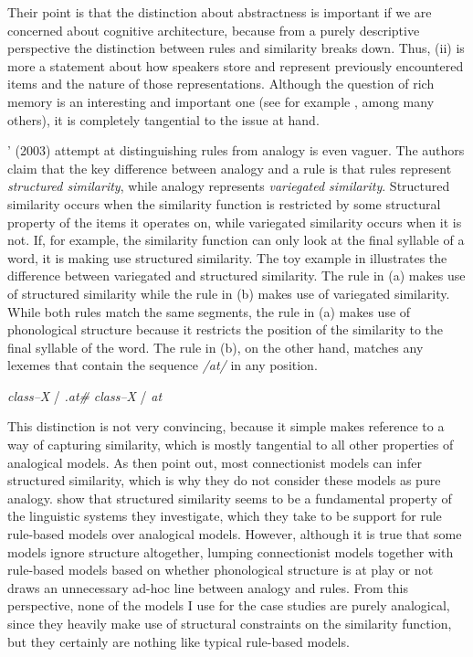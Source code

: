 Their point is that the distinction about abstractness is important if we are concerned about cognitive architecture, because from a purely descriptive perspective the distinction between rules and similarity breaks down. Thus, (ii) is more a statement about how speakers store and represent previously encountered items and the nature of those representations. Although the question of rich memory is an interesting and important one (see for example \cites{Bybee.2010, Kapatsinski.2014a, Port.2010a}, among many others), it is completely tangential to the issue at hand.

\citeauthor{Albright.2003}' (2003) attempt at distinguishing rules from analogy is even vaguer. The authors claim that the key difference between analogy and a rule is that rules represent \emph{structured similarity}, while analogy represents \emph{variegated similarity}. Structured similarity occurs when the similarity function is restricted by some structural property of the items it operates on, while variegated similarity occurs when it is not. If, for example, the similarity function can only look at the final syllable of a word, it is making use structured similarity. The toy example in  illustrates the difference between variegated and structured similarity. The rule in (a) makes use of structured similarity while the rule in (b) makes use of variegated similarity. While both rules match the same segments, the rule in (a) makes use of phonological structure because it restricts the position of the similarity to the final syllable of the word. The rule in (b), on the other hand, matches any lexemes that contain the sequence \textit{/at/} in any position.

\begin{exe}
    \ex \label{structured-simil}
    \begin{xlist}
        \ex \textit{class--X} / \textit{.at\#}
        \ex \textit{class--X} / \textit{at}
    \end{xlist}
\end{exe}

This distinction is not very convincing, because it simple makes reference to a way of capturing similarity, which is mostly tangential to all other properties of analogical models. As \textcite[5]{Albright.2003} then point out, most connectionist models can infer structured similarity, which is why they do not consider these models as pure analogy. \textcite{Albright.2003} show that structured similarity seems to be a fundamental property of the linguistic systems they investigate, which they take to be support for rule rule-based models over analogical models. However, although it is true that some models ignore structure altogether, lumping connectionist models together with rule-based models based on whether phonological structure is at play or not draws an unnecessary ad-hoc line  between analogy and rules. From this perspective, none of the models I use for the case studies are purely analogical, since they heavily make use of structural constraints on the similarity function, but they certainly are nothing like typical rule-based models.

